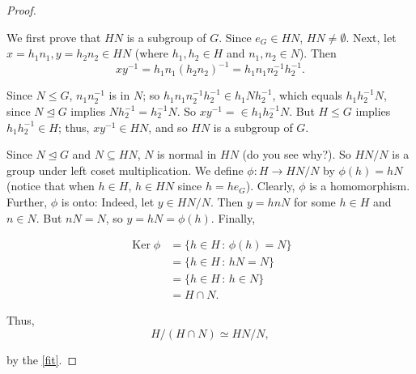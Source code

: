 \documentclass[10pt,]{book}
\theoremstyle{plain}
\theoremstyle{definition}
\theoremstyle{definition}
\theoremstyle{definition}
\theoremstyle{definition}
\numberwithin{equation}{section}
\DeclareMathOperator{\Ker}{Ker}
\newcommand{\amp}{ & }
\begin{document}
\begin{proof}\hypertarget{proof-55}{}

      We first prove that \(HN\) is a subgroup of \(G\). Since \(e_G\in
      HN\), \(HN\neq \emptyset\). Next, let \(x=h_1n_1, y=h_2n_2\in HN\)
      (where \(h_1,h_2\in H\) and \(n_1,n_2\in N\)). Then
\begin{equation*}

        xy^{-1}=h_1n_1(h_2n_2)^{-1}=h_1n_1n_2^{-1}h_2^{-1}.
      
\end{equation*}

\par

      Since
      \(N\leq G\), \(n_1n_2^{-1}\) is in \(N\); so \(h_1n_1n_2^{-1}h_2^{-1}\in
      h_1Nh_2^{-1}\), which equals \(h_1h_2^{-1}N\), since \(N\unlhd G\)
      implies \(Nh_2^{-1}=h_2^{-1}N\). So \(xy^{-1}=\in h_1h_2^{-1}N.\) But
      \(H\leq G\) implies \(h_1h_2^{-1}\in H\); thus, \(xy^{-1}\in HN\), and so
      \(HN\) is a subgroup of \(G\).
\par

      Since \(N\unlhd G\) and \(N\subseteq HN\), \(N\) is normal in \(HN\)
      (do you see why?). So \(HN/N\) is a group under left coset
      multiplication. We define \(\phi: H\to HN/N\) by \(\phi(h)=hN\)
      (notice that when \(h\in H\), \(h\in HN\) since \(h=he_G\)). Clearly,
      \(\phi\) is a homomorphism. Further, \(\phi\) is onto: Indeed, let
      \(y\in HN/N\). Then \(y=hnN\) for some \(h\in H\) and \(n\in N\). But
      \(nN=N\), so \(y=hN=\phi(h)\). Finally,
      

\begin{align*}
\Ker \phi\amp =\{h\in H\,:\, \phi(h)=N\}\\
\amp =\{h\in H\,:\, hN=N\}\\
\amp =\{h\in
        H\,:\, h\in N\}\\
\amp =H\cap N.
\end{align*}

\par

      Thus,
\begin{equation*}

        H/(H\cap N)
        \simeq HN/N,
      
\end{equation*}

      by the \hyperref[fit]{\ref{fit}}.
\end{proof}
\end{document}
